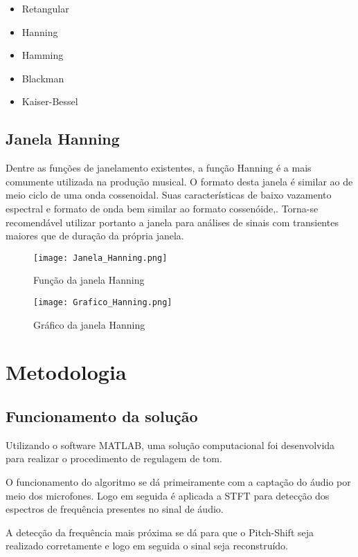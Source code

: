 \begin{itemize}
	\item Retangular
	\item Hanning
	\item Hamming
	\item Blackman
	\item Kaiser-Bessel
\end{itemize}
 
\section*{Janela Hanning}

Dentre as funções de janelamento existentes, a função Hanning é a mais comumente utilizada na produção musical. O formato desta janela é similar ao de meio ciclo de uma onda cossenoidal. Suas características de baixo vazamento espectral e  formato de onda bem similar ao formato cossenóide,. Torna-se recomendável utilizar portanto a janela para análises de sinais com transientes maiores que de duração da própria janela.

\begin{figure}[h]
	\centering
	\texttt{[image: Janela\_Hanning.png]}
	\label{fig:Janela Hanning}
	\caption{Função da janela Hanning}
\end{figure}

\begin{figure}[h]
	\centering
	\texttt{[image: Grafico\_Hanning.png]}
	\label{fig:Gráfico Hanning}
	\caption{Gráfico da janela Hanning}
\end{figure}

\newpage

\chapter{Metodologia}
\section*{Funcionamento da solução}
Utilizando o software MATLAB, uma solução computacional foi desenvolvida para realizar o procedimento de regulagem de tom. 

O funcionamento do algoritmo se dá primeiramente com a captação do áudio por meio dos microfones. Logo em seguida é aplicada a STFT para detecção dos espectros de frequência presentes no sinal de áudio. 

A detecção da frequência mais próxima se dá para que o Pitch-Shift seja realizado corretamente e logo em seguida o sinal seja reconstruído.

